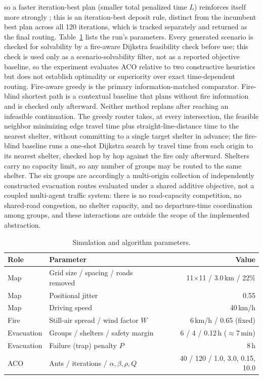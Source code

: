 \documentclass{ai-lab-report}
\begin{document}
so a faster iteration-best plan (smaller total penalized time $L$) reinforces itself more strongly \citep{stutzle2000maxmin}; this is an iteration-best deposit rule, distinct from the incumbent best plan across all 120 iterations, which is tracked separately and returned as the final routing. Table~\ref{tab:a3-params} lists the run's parameters. Every generated scenario is checked for solvability by a fire-aware Dijkstra feasibility check before use; this check is used only as a scenario-solvability filter, not as a reported objective baseline, so the experiment evaluates ACO relative to two constructive heuristics but does not establish optimality or superiority over exact time-dependent routing. Fire-aware greedy is the primary information-matched comparator. Fire-blind shortest path is a contextual baseline that plans without fire information and is checked only afterward. Neither method replans after reaching an infeasible continuation. The greedy router takes, at every intersection, the feasible neighbor minimizing edge travel time plus straight-line-distance time to the nearest shelter, without committing to a single target shelter in advance; the fire-blind baseline runs a one-shot Dijkstra search by travel time from each origin to its nearest shelter, checked hop by hop against the fire only afterward. Shelters carry no capacity limit, so any number of groups may be routed to the same shelter. The six groups are accordingly a multi-origin collection of independently constructed evacuation routes evaluated under a shared additive objective, not a coupled multi-agent traffic system: there is no road-capacity competition, no shared-road congestion, no shelter capacity, and no departure-time coordination among groups, and these interactions are outside the scope of the implemented abstraction.

\begin{table}[H]
\centering
\small
\caption{Simulation and algorithm parameters.}
\label{tab:a3-params}
\begin{tabular}{llr}
\toprule
Role & Parameter & Value \\
\midrule
Map & Grid size / spacing / roads removed & 11$\times$11 / 3.0\,km / 22\% \\
Map & Positional jitter & 0.55 \\
Map & Driving speed & 40\,km/h \\
Fire & Still-air spread / wind factor $W$ & 6\,km/h / 0.65 (fixed) \\
Evacuation & Groups / shelters / safety margin & 6 / 4 / 0.12\,h ($\approx$7\,min) \\
Evacuation & Failure (trap) penalty $P$ & 8\,h \\
ACO & Ants / iterations / $\alpha,\beta,\rho,Q$ & 40 / 120 / 1.0, 3.0, 0.15, 10.0 \\
\bottomrule
\end{tabular}
\end{table}
\end{document}
